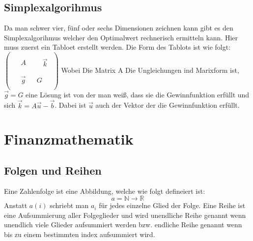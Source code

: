 \documentclass[a4paper]{scrartcl}
\begin{document}
    \subsection{Simplexalgorihmus}
    Da man schwer vier, fünf oder sechs Dimensionen zeichnen kann gibt es den Simplexalgorihmus welcher den Optimalwert rechnerisch ermitteln kann. Hier muss zuerst ein Tabloet erstellt werden.
    Die Form des Tablots ist wie folgt:
    \(
        \begin{pmatrix}
            \begin{matrix}
                 &   & \\
                 & A & \\
                 &   & 
            \end{matrix}
            \begin{matrix}
               & \\ & \vec{k} \\ &   
            \end{matrix} \\

            \hline
            \begin{matrix}
                &\vec{g} & &  G \\             
            \end{matrix}   
        \end{pmatrix}
    \)
    Wobei Die Matrix A Die Ungleichungen ind Marixform ist, \(\vec{g} = G\) eine Lösung ist von der man weiß, dass sie die Gewinnfunktion erfüllt und sich \(\vec{k} = A\vec{u} - \vec{b}\). Dabei ist
    \(\vec{u}\) auch der Vektor der die Gewinnfunktion erfüllt. 

    \section{Finanzmathematik}
        \subsection{Folgen und Reihen}
        Eine Zahlenfolge ist eine Abbildung, welche wie folgt defineiert ist:
        \begin{equation*}
            a = \mathbb{N} \rightarrow \mathbb{R}
        \end{equation*}
        Anstatt \(a(i)\) schriebt man \(a_i\) für jedes einzelne Glied der Folge. 
        Eine Reihe ist eine Aufsummierung aller Folgeglieder und wird unendliche Reihe genannt wenn unendlich viele Glieder aufsummiert werden bzw. endliche Reihe genannt wenn bis zu einem 
        bestimmten index aufsummiert wird. 
        
\end{document}
